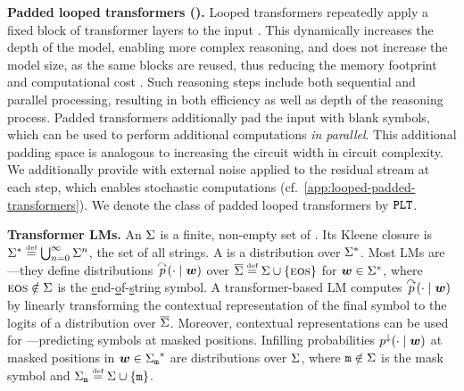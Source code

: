 \documentclass{article} %
\begin{document}
\textbf{Padded looped transformers (\LTsAcr).} 
Looped transformers repeatedly apply a fixed block of transformer layers to the input \citep{dehghani2019universaltransformers}.
This dynamically increases the depth of the model, enabling more complex reasoning, and does not increase the model size, as the same blocks are reused, thus reducing the memory footprint and computational cost \citep{bae2025mixtureofrecursionslearningdynamicrecursive}.
Such reasoning steps include both sequential and parallel processing, resulting in both efficiency as well as depth of the reasoning process.
Padded transformers additionally pad the input with blank symbols, which can be used to perform additional computations \emph{in parallel}.
This additional padding space is analogous to increasing the circuit width in circuit complexity.
We additionally provide \LTsAcr with external noise applied to the residual stream at each step, which enables stochastic computations
(cf.~\cref{app:looped-padded-transformers}).
We denote the class of padded looped transformers by ${\mathtt{PLT}}$.


\textbf{Transformer LMs.}
An  ${{\Sigma}}$ is a finite, non-empty set of . 
Its Kleene closure is ${{{{{{\Sigma}}^{*}}}}} \mathrel{\stackrel{\textnormal{\tiny def}}{=}} \bigcup_{n=0}^{\infty} {{\Sigma}}^n$, the set of all strings.
A  is a distribution over ${{{{{{\Sigma}}^{*}}}}}$.
Most LMs are ---they define  distributions ${{\overset{\curvearrowright}{{{p}}}}(\cdot \mid {{\boldsymbol{w}}})}$ over ${{\overline{{{\Sigma}}}}} \mathrel{\stackrel{\textnormal{\tiny def}}{=}} {{\Sigma}} \cup {\left\{ {{\textsc{eos}}}\right\}}$ for ${{\boldsymbol{w}}} \in {{{{\Sigma}}^{*}}}$, where ${{\textsc{eos}}} \notin {{\Sigma}}$ is the \underline{e}nd-\underline{o}f-\underline{s}tring symbol.
A transformer-based LM computes ${{\overset{\curvearrowright}{{{p}}}}(\cdot \mid {{\boldsymbol{w}}})}$ by linearly transforming the contextual representation of the final symbol to the logits of a distribution over ${{\overline{{{\Sigma}}}}}$.
Moreover, contextual representations can be used for ---predicting symbols at masked positions.
Infilling probabilities ${{{{p}}^{\downarrow}}(\cdot \mid {{\boldsymbol{w}}})}$ at masked positions in ${{\boldsymbol{w}}} \in {{{{{\Sigma}}_{{\texttt{m}}}}^{*}}}$ are distributions over ${{\Sigma}}$, where ${\texttt{m}} \notin {{\Sigma}}$ is the mask symbol and ${{{\Sigma}}_{{\texttt{m}}}} \mathrel{\stackrel{\textnormal{\tiny def}}{=}} {{\Sigma}} \cup {\left\{ {\texttt{m}}\right\}}$.
\end{document}
